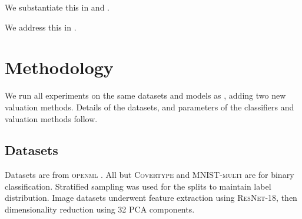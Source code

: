 \documentclass[10pt]{article}
\newcommand{\tmname}[1]{\textsc{#1}}
\begin{document}
{}

We substantiate this in  and .

{}

We address this in .

\section{Methodology}

We run all experiments on the same datasets and models as
{\cite{schoch_csshapley_2022}}, adding two new valuation methods. Details of
the datasets, and parameters of the classifiers and valuation methods follow.

\subsection{Datasets}

Datasets are from {\tmname{openml}} {\citep{vanschoren_openml_2013}}. All
but {\tmname{Covertype}} and {\tmname{MNIST-multi}} are for binary
classification. Stratified sampling was used for the splits to maintain label
distribution. Image datasets underwent feature extraction using
{\tmname{ResNet-18}}, then dimensionality reduction using 32 PCA components.
\end{document}
